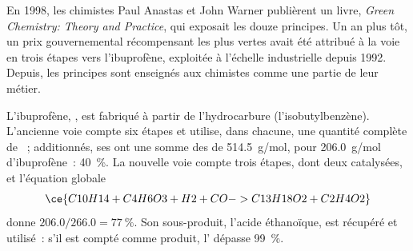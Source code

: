 \begin{history}
En 1998, les chimistes Paul Anastas et John Warner publièrent un livre,
\emph{Green Chemistry: Theory and Practice}, qui exposait les douze
principes. Un an plus tôt, un prix gouvernemental récompensant les
 plus vertes avait été attribué à la voie en trois étapes vers
l'ibuprofène, exploitée à l'échelle industrielle depuis 1992. Depuis, les
principes sont enseignés aux chimistes comme une partie de leur métier.
\end{history}

\begin{example}\label{ex:g12:synthesis-strategy:ibuprofen}
L'ibuprofène, , est fabriqué à partir de l'hydrocarbure
 (l'isobutylbenzène). L'ancienne voie compte six étapes et
utilise, dans chacune, une quantité complète de ~; additionnés,
ses  ont une somme des  de \qty{514.5}{g/mol},
pour \qty{206.0}{g/mol} d'ibuprofène~: 
\qty{40}{\percent}. La nouvelle voie compte trois
étapes, dont deux catalysées, et l'équation globale
\[
  \ce{C10H14 + C4H6O3 + H2 + CO -> C13H18O2 + C2H4O2}
\]
donne $206.0/266.0 = \qty{77}{\percent}$. Son sous-produit, l'acide
éthanoïque, est récupéré et utilisé~: s'il est compté comme produit,
l' dépasse
\qty{99}{\percent}.
\end{example}

